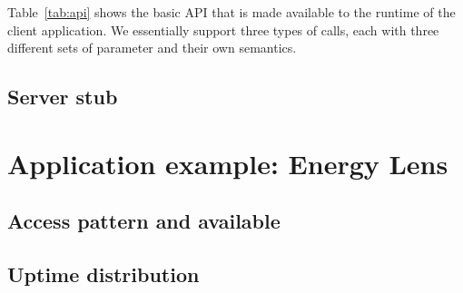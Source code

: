 Table~\ref{tab:api} shows the basic API that is made available to the runtime of the client application.  We essentially support three
types of calls, each with three different sets of parameter and their own semantics.


\subsection{Server stub}

\section{Application example: Energy Lens}

\subsection {Access pattern and available}

\subsection {Uptime distribution}




